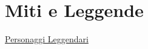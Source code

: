 \section{Miti e Leggende}\label{miti-e-leggende}

\href{Personaggi\%20Leggendari\%209d427a8e62a34b8787dcfd3fd1b8e63c.md}{Personaggi
Leggendari}
